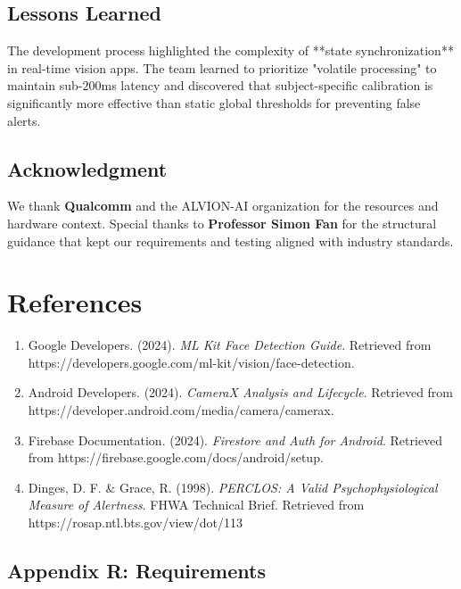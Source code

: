 \documentclass[11pt]{report}
\begin{document}
\section{Lessons Learned}
The development process highlighted the complexity of **state synchronization** in real-time vision apps. The team learned to prioritize "volatile processing" to maintain sub-$200$ms latency and discovered that subject-specific calibration is significantly more effective than static global thresholds for preventing false alerts.

\section{Acknowledgment}
We thank \textbf{Qualcomm} and the ALVION-AI organization for the resources and hardware context. Special thanks to \textbf{Professor Simon Fan} for the structural guidance that kept our requirements and testing aligned with industry standards.

\clearpage

\chapter{References}

\begin{enumerate}
    \item \label{google2024mlkit} Google Developers. (2024). \textit{ML Kit Face Detection Guide}. Retrieved from https://developers.google.com/ml-kit/vision/face-detection.
    \item \label{android2024camerax} Android Developers. (2024). \textit{CameraX Analysis and Lifecycle}. Retrieved from https://developer.android.com/media/camera/camerax.
    \item \label{firebase2024docs} Firebase Documentation. (2024). \textit{Firestore and Auth for Android}. Retrieved from https://firebase.google.com/docs/android/setup.
    \item \label{dinges1998perclos} Dinges, D. F. \& Grace, R. (1998). \textit{PERCLOS: A Valid Psychophysiological Measure of Alertness}. FHWA Technical Brief. Retrieved from https://rosap.ntl.bts.gov/view/dot/113
\end{enumerate}



\section*{Appendix R: Requirements}

\end{document}

